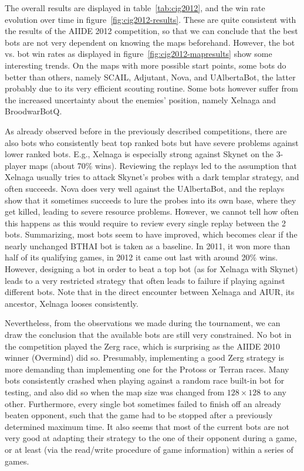 \documentclass{llncs}
\begin{document}

The overall results are displayed in table~\ref{tab:cig2012},
and the win rate evolution over time in figure~\ref{fig:cig2012-results}.
These are quite consistent with the results of the AIIDE 2012 competition,
so that we can conclude that the best bots are not very dependent on 
knowing the maps beforehand. However, the bot vs. bot win rates as
displayed in figure~\ref{fig:cig2012-mapresults} show some interesting
trends. On the maps with more possible start points, some bots do 
better than others, namely SCAIL, Adjutant, Nova, and UAlbertaBot,
the latter probably due to its very efficient scouting routine.
Some bots however suffer from the increased uncertainty about
the enemies' position, namely Xelnaga and BroodwarBotQ.

As already observed before in the previously described competitions,
there are also bots who consistently beat top ranked bots but have
severe problems against lower ranked bots. E.g., Xelnaga is especially
strong against Skynet on the 3-player maps (about 70\% wins). Reviewing
the replays led to the assumption that Xelnaga usually tries to attack
Skynet's probes with a dark templar strategy, and often succeeds. 
Nova does very well against the UAlbertaBot, and the replays show
that it sometimes succeeds to lure the probes into its own base, where
they get killed, leading to severe resource problems. However, we cannot
tell how often this happens as this would require to review every single
replay between the 2 bots. Summarizing, most bots seem to have improved,
which becomes clear if the nearly unchanged BTHAI bot is taken as a baseline.
In 2011, it won more than half of its qualifying games, in 2012 it came
out last with around 20\% wins. However, designing a bot in order to 
beat a top bot (as for Xelnaga with Skynet) leads to a very restricted
strategy that often leads to failure if playing against different bots.
Note that in the direct encounter between Xelnaga and AIUR, its ancestor,
Xelnaga looses consistently.

Nevertheless, from the observations we made during the tournament,
we can draw the conclusion that the available bots are still 
very constrained. No bot in the competition played the Zerg race,
which is surprising as the AIIDE 2010 winner (Overmind) did so.
Presumably, implementing a good Zerg strategy is more demanding
than implementing one for the Protoss or Terran races. Many bots consistently crashed
when playing against a random race built-in bot for testing, and
also did so when the map size was changed from $128\times 128$ to 
any other. Furthermore, every single bot sometimes failed to finish
off an already beaten opponent, such that the game had to be stopped
after a previously determined maximum time. It also seems that most of
the current bots are not very good at adapting their strategy to the
one of their opponent during a game, or at least (via the read/write
procedure of game information) within a series of games.
\end{document}
